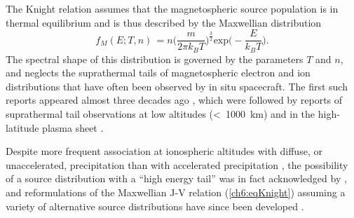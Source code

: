   The Knight relation assumes that the magnetospheric source population is in
  thermal equilibrium and is thus described by the Maxwellian distribution
  \begin{equation} \label{ch6:eqMax1D} f_{M}( E ; T, n) \, = n \Big (
    \dfrac{m}{2 \pi k_{B} T} \Big )^{\frac{3}{2}} \textrm{exp} \Big (
    - \dfrac{E}{ k_B T } \Big ).
  \end{equation}
  The spectral shape of this distribution is governed by the parameters $T$ and
  $n$, and neglects the suprathermal tails of magnetospheric electron and ion
  distributions that have often been observed by in situ spacecraft. The first
  such reports appeared almost three decades ago
  \citep{Christon1989,Christon1991}, which were followed by reports of
  suprathermal tail observations at low altitudes (<~1000~km) and in the
  high-latitude plasma sheet \citep{Wing1998,Kletzing2003}.

  Despite more frequent association at ionospheric altitudes with diffuse, or
  unaccelerated, precipitation than with accelerated precipitation \citep[e.g.,
  ][]{Newell2009,McIntosh2014}, the possibility of a source distribution with a
  ``high energy tail'' was in fact acknowledged by \citet{Knight1973}, and
  reformulations of the Maxwellian J-V relation (\ref{ch6:eqKnight}) assuming a
  variety of alternative source distributions have since been developed
  \citep{Pierrard1996,Janhunen1998,Dors1999,Bostrom2003a,Bostrom2004}.

